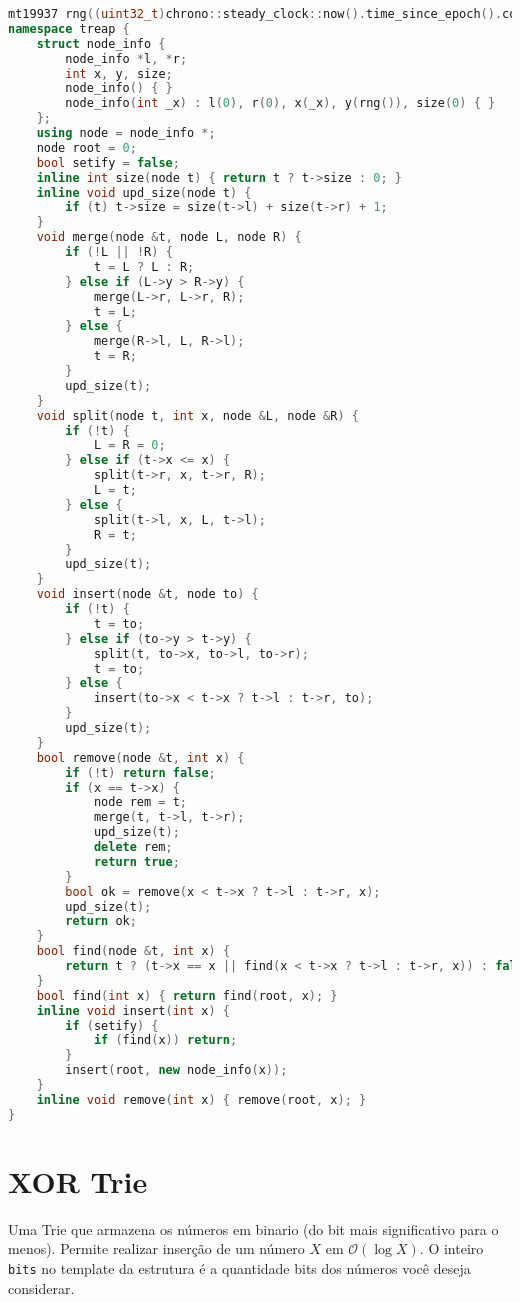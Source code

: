 \documentclass[10pt, a4paper, oneside]{book}
\begin{document}
\begin{lstlisting}[language=C++]
mt19937 rng((uint32_t)chrono::steady_clock::now().time_since_epoch().count());
namespace treap {
    struct node_info {
        node_info *l, *r;
        int x, y, size;
        node_info() { }
        node_info(int _x) : l(0), r(0), x(_x), y(rng()), size(0) { }
    };
    using node = node_info *;
    node root = 0;
    bool setify = false;
    inline int size(node t) { return t ? t->size : 0; }
    inline void upd_size(node t) {
        if (t) t->size = size(t->l) + size(t->r) + 1;
    }
    void merge(node &t, node L, node R) {
        if (!L || !R) {
            t = L ? L : R;
        } else if (L->y > R->y) {
            merge(L->r, L->r, R);
            t = L;
        } else {
            merge(R->l, L, R->l);
            t = R;
        }
        upd_size(t);
    }
    void split(node t, int x, node &L, node &R) {
        if (!t) {
            L = R = 0;
        } else if (t->x <= x) {
            split(t->r, x, t->r, R);
            L = t;
        } else {
            split(t->l, x, L, t->l);
            R = t;
        }
        upd_size(t);
    }
    void insert(node &t, node to) {
        if (!t) {
            t = to;
        } else if (to->y > t->y) {
            split(t, to->x, to->l, to->r);
            t = to;
        } else {
            insert(to->x < t->x ? t->l : t->r, to);
        }
        upd_size(t);
    }
    bool remove(node &t, int x) {
        if (!t) return false;
        if (x == t->x) {
            node rem = t;
            merge(t, t->l, t->r);
            upd_size(t);
            delete rem;
            return true;
        }
        bool ok = remove(x < t->x ? t->l : t->r, x);
        upd_size(t);
        return ok;
    }
    bool find(node &t, int x) {
        return t ? (t->x == x || find(x < t->x ? t->l : t->r, x)) : false;
    }
    bool find(int x) { return find(root, x); }
    inline void insert(int x) {
        if (setify) {
            if (find(x)) return;
        }
        insert(root, new node_info(x));
    }
    inline void remove(int x) { remove(root, x); }
}
\end{lstlisting}
\hfill

\section{XOR Trie}


Uma Trie que armazena os números em binario (do bit mais significativo para o menos). Permite realizar inserção de um número $X$ em $\mathcal{O}(\log X)$. O inteiro \texttt{bits} no template da estrutura é a quantidade bits dos números você deseja considerar.
\end{document}
